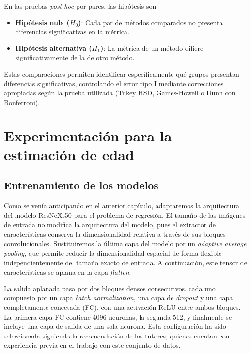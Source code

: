 En las pruebas \textit{post-hoc} por pares, las hipótesis son:

\begin{itemize}
    \item \textbf{Hipótesis nula ($H_0$)}: Cada par de métodos comparados no presenta diferencias significativas en la métrica.
    \item \textbf{Hipótesis alternativa ($H_1$)}: La métrica de un método difiere significativamente de la de otro método.
\end{itemize}

Estas comparaciones permiten identificar específicamente qué grupos presentan diferencias significativas, controlando el error tipo I mediante correcciones apropiadas según la prueba utilizada (Tukey HSD, Games-Howell o Dunn con Bonferroni).


\section{Experimentación para la estimación de edad}


\subsection{Entrenamiento de los modelos}

Como se venía anticipando en el anterior capítulo, adaptaremos la arquitectura del modelo ResNeXt50 para el problema de regresión. El tamaño de las imágenes de entrada no modifica la arquitectura del modelo, pues el extractor de características conserva la dimensionalidad relativa a través de sus bloques convolucionales. Sustituiremos la última capa del modelo por un \textit{adaptive average pooling}, que permite reducir la dimensionalidad espacial de forma flexible independientemente del tamaño exacto de entrada. A continuación, este tensor de características se aplana en la capa \textit{flatten}.

La salida aplanada pasa por dos bloques densos consecutivos, cada uno compuesto por un capa \textit{batch normalization}, una capa de \textit{dropout} y una capa completamente conectada (\acrshort{FC}), con una activación ReLU entre ambos bloques. La primera capa \acrshort{FC} contiene 4096 neuronas, la segunda 512, y finalmente se incluye una capa de salida de una sola neurona. Esta configuración ha sido seleccionada siguiendo la recomendación de los tutores, quienes cuentan con experiencia previa en el trabajo con este conjunto de datos.

